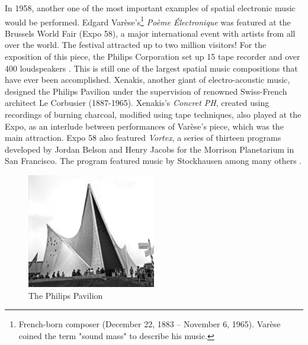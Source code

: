 In 1958, another one of the most important examples of spatial electronic music would be performed. Edgard Varèse's\footnote{French-born composer (December 22, 1883 – November 6, 1965). Varèse coined the term "sound mass" to describe his music.} \textit{Poème Électronique} was featured at the Brussels World Fair (Expo 58), a major international event with artists from all over the world. The festival attracted up to two million visitors! For the exposition of this piece, the Philips Corporation set up 15 tape recorder and over 400 loudspeakers \cite{malham19953}. This is still one of the largest spatial music compositions that have ever been accomplished. Xenakis, another giant of electro-acoustic music, designed the Philips Pavilion under the supervision of renowned Swiss-French architect Le Corbusier (1887-1965). Xenakis's \textit{Concret PH}, created using recordings of burning charcoal, modified using tape techniques, also played at the Expo, as an interlude between performances of Varèse's piece, which was the main attraction\cite{valle2010concrete}. Expo 58 also featured \textit{Vortex}, a series of thirteen programs developed by Jordan Belson and Henry Jacobs for the Morrison Planetarium in San Francisco. The program featured music by Stockhausen among many others \cite{zvonar1999history}.

\begin{figure}[h]%
\centering
\includegraphics[width=0.5\textwidth]{img/expo58.jpg} 
\caption{The Philips Pavilion \cite{wikipedia_2020_expo}}
\end{figure}

